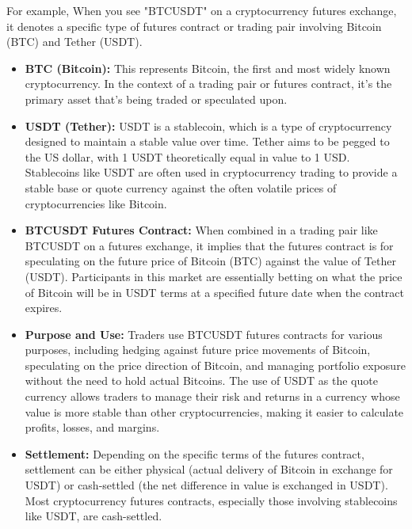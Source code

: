\documentclass{report}
\begin{document}
    \bigbreak \noindent 
    \bigbreak \noindent 
    For example, When you see "BTCUSDT" on a cryptocurrency futures exchange, it denotes a specific type of futures contract or trading pair involving Bitcoin (BTC) and Tether (USDT). 
    \bigbreak \noindent 
    \begin{itemize}
        \item \textbf{BTC (Bitcoin):} This represents Bitcoin, the first and most widely known cryptocurrency. In the context of a trading pair or futures contract, it's the primary asset that's being traded or speculated upon.
        \item \textbf{USDT (Tether):} USDT is a stablecoin, which is a type of cryptocurrency designed to maintain a stable value over time. Tether aims to be pegged to the US dollar, with 1 USDT theoretically equal in value to 1 USD. Stablecoins like USDT are often used in cryptocurrency trading to provide a stable base or quote currency against the often volatile prices of cryptocurrencies like Bitcoin.
        \item \textbf{BTCUSDT Futures Contract:} When combined in a trading pair like BTCUSDT on a futures exchange, it implies that the futures contract is for speculating on the future price of Bitcoin (BTC) against the value of Tether (USDT). Participants in this market are essentially betting on what the price of Bitcoin will be in USDT terms at a specified future date when the contract expires.
        \item \textbf{Purpose and Use:} Traders use BTCUSDT futures contracts for various purposes, including hedging against future price movements of Bitcoin, speculating on the price direction of Bitcoin, and managing portfolio exposure without the need to hold actual Bitcoins. The use of USDT as the quote currency allows traders to manage their risk and returns in a currency whose value is more stable than other cryptocurrencies, making it easier to calculate profits, losses, and margins.
        \item \textbf{Settlement:} Depending on the specific terms of the futures contract, settlement can be either physical (actual delivery of Bitcoin in exchange for USDT) or cash-settled (the net difference in value is exchanged in USDT). Most cryptocurrency futures contracts, especially those involving stablecoins like USDT, are cash-settled.
    \end{itemize}


    \pagebreak 
    \bigbreak \noindent 
\end{document}
